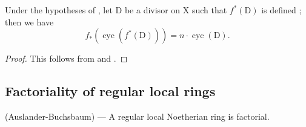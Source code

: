 \begin{corollary}[21.10.19]
\label{IV.21.10.19}
Under the hypotheses of , let $\mathrm{D}$ be a divisor on $\mathrm{X}$ such that $f^*(\mathrm{D})$ is defined ; then we have
\[
\label{IV.21.10.19.1}
  f_*(\operatorname{cyc}(f^*(\mathrm{D})))=n\cdot\operatorname{cyc}(\mathrm{D}).
  \tag{21.10.19.1}
\]
\end{corollary}

\begin{proof}
This follows from  and .
\end{proof}

\subsection{Factoriality of regular local rings}
\label{subsection:IV.21.11}

\begin{theorem}[21.11.1]
\label{IV.21.11.1}
\textup{(Auslander-Buchsbaum)} ---
A regular local Noetherian ring is factorial.
\end{theorem}

